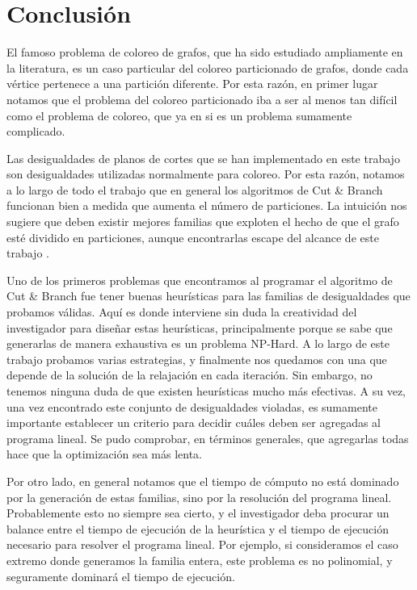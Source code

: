 \section{Conclusión}

El famoso problema de coloreo de grafos, que ha sido estudiado ampliamente en la literatura, es un caso particular del coloreo particionado de grafos, donde cada vértice pertenece a una partición diferente. Por esta razón, en primer lugar notamos que el problema del coloreo particionado iba a ser al menos tan difícil como el problema de coloreo, que ya en si es un problema sumamente complicado.

Las desigualdades de planos de cortes que se han implementado en este trabajo son desigualdades utilizadas normalmente para coloreo. Por esta razón, notamos a lo largo de todo el trabajo que en general los algoritmos de Cut \& Branch funcionan bien a medida que aumenta el número de particiones. La intuición nos sugiere que deben existir mejores familias que exploten el hecho de que el grafo esté dividido en particiones, aunque encontrarlas escape del alcance de este trabajo \cite{coloring}.

Uno de los primeros problemas que encontramos al programar el algoritmo de Cut \& Branch fue tener buenas heurísticas para las familias de desigualdades que probamos válidas. Aquí es donde interviene sin duda la creatividad del investigador para diseñar estas heurísticas, principalmente porque se sabe que generarlas de manera exhaustiva es un problema NP-Hard. A lo largo de este trabajo probamos varias estrategias, y finalmente nos quedamos con una que depende de la solución de la relajación en cada iteración. Sin embargo, no tenemos ninguna duda de que existen heurísticas mucho más efectivas. A su vez, una vez encontrado este conjunto de desigualdades violadas, es sumamente importante establecer un criterio para decidir cuáles deben ser agregadas al programa lineal. Se pudo comprobar, en términos generales, que agregarlas todas hace que la optimización sea más lenta.

Por otro lado, en general notamos que el tiempo de cómputo no está dominado por la generación de estas familias, sino por la resolución del programa lineal. Probablemente esto no siempre sea cierto, y el investigador deba procurar un balance entre el tiempo de ejecución de la heurística y el tiempo de ejecución necesario para resolver el programa lineal. Por ejemplo, si consideramos el caso extremo donde generamos la familia entera, este problema es no polinomial, y seguramente dominará el tiempo de ejecución.


